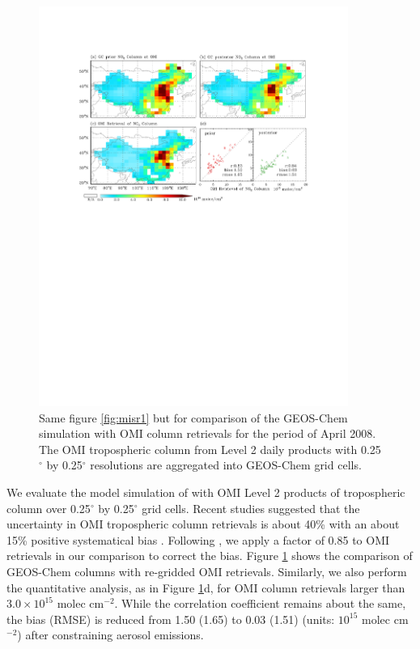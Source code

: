  \begin{figure}[t]
  \centering
  \includegraphics[width={0.9\textwidth}]{figures/a9.pdf}
  \caption{Same figure \ref{fig:misr1} but for comparison of the GEOS-Chem  simulation with OMI column  retrievals for the period of April 2008.  The OMI tropospheric column  from Level 2 daily products with 0.25$^{\circ}$ by 0.25$^{\circ}$ resolutions are aggregated into GEOS-Chem grid cells.}
  \label{fig:omno2}
 \end{figure}

 We evaluate the model simulation of  with OMI Level 2 products of
  tropospheric column over 0.25$^{\circ}$ by 0.25$^{\circ}$ grid cells.
 Recent studies suggested that the uncertainty in OMI  tropospheric column retrievals
 is about 40\% with an about 15\% positive systematical bias \citep{Boersma08,Celarier08}.
 Following \citet{lin10}, we apply a factor of 0.85 to OMI  retrievals
 in our comparison to correct the bias.
 Figure \ref{fig:omno2} shows the comparison of GEOS-Chem  columns
 with re-gridded OMI  retrievals.
 Similarly, we also perform the quantitative analysis, as in Figure \ref{fig:omno2}d,
 for OMI  column retrievals larger than $3.0 \times 10^{15}$ molec cm$^{-2}$.
 While the correlation coefficient remains about the same, the bias (RMSE) is reduced
 from 1.50 (1.65) to 0.03 (1.51) (units: $10^{15}$ molec cm$^{-2}$) after constraining aerosol emissions. 

